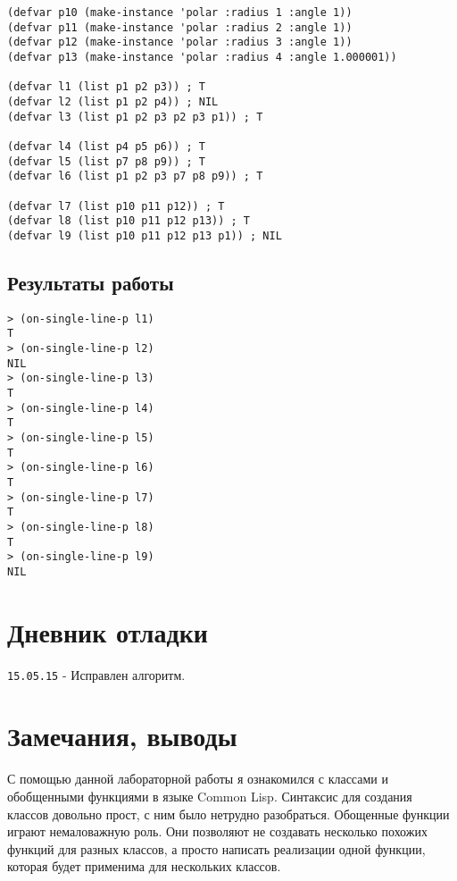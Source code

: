 \documentclass[a4paper, 12pt]{article}
\begin{document}
\begin{lstlisting}
(defvar p10 (make-instance 'polar :radius 1 :angle 1))
(defvar p11 (make-instance 'polar :radius 2 :angle 1))
(defvar p12 (make-instance 'polar :radius 3 :angle 1))
(defvar p13 (make-instance 'polar :radius 4 :angle 1.000001))

(defvar l1 (list p1 p2 p3)) ; T
(defvar l2 (list p1 p2 p4)) ; NIL
(defvar l3 (list p1 p2 p3 p2 p3 p1)) ; T

(defvar l4 (list p4 p5 p6)) ; T
(defvar l5 (list p7 p8 p9)) ; T
(defvar l6 (list p1 p2 p3 p7 p8 p9)) ; T

(defvar l7 (list p10 p11 p12)) ; T
(defvar l8 (list p10 p11 p12 p13)) ; T
(defvar l9 (list p10 p11 p12 p13 p1)) ; NIL
\end{lstlisting}


\subsection{Результаты работы}
\begin{lstlisting}
> (on-single-line-p l1)
T
> (on-single-line-p l2)
NIL
> (on-single-line-p l3)
T
> (on-single-line-p l4)
T
> (on-single-line-p l5)
T
> (on-single-line-p l6)
T
> (on-single-line-p l7)
T
> (on-single-line-p l8)
T
> (on-single-line-p l9)
NIL
\end{lstlisting}


\section{Дневник отладки}
{\tt 15.05.15} - Исправлен алгоритм.

\section{Замечания, выводы}
С помощью данной лабораторной работы я ознакомился с классами и обобщенными функциями в языке Common Lisp. Синтаксис для создания классов довольно прост, с ним было нетрудно разобраться. Обощенные функции играют немаловажную роль. Они позволяют не создавать несколько похожих функций для разных классов, а просто написать реализации одной функции, которая будет применима для нескольких классов.
\end{document}
